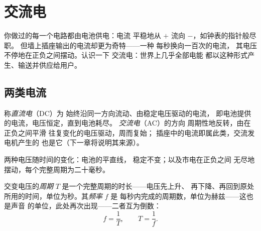 \chapter{交流电}\label{ch:g9:alternating-current}

你做过的每一个电路都由电池供电：电流
平稳地从 $+$ 流向 $-$，如钟表的指针般尽职。
但墙上插座输出的电流却更为奇特——一种
每秒换向一百次的电流，
其电压不停地在正负之间摆动。认识一下
交流电：世界上几乎全部电能
都以这种形式产生、输送并供应给用户。

\section{两类电流}

\begin{definition}[直流电与交流电]\label{def:g9:alternating-current:dcac}
称\emph{直流电}（DC）为
始终沿同一方向流动、由稳定电压驱动的电流，
即电池提供的电流，电压恒定，直到电池耗尽。
\emph{交流电}（AC）的方向
周期性地反转，由在正负之间平滑
往复变化的电压驱动，周而复始；
插座中的电流即属此类，交流发电机产生的
也是它（下一章将说明其来源）。
\end{definition}

\begin{omfigure}

{\small 两种电压随时间的变化：电池的平直线，
稳定不变；以及市电在正负之间
无尽地摆动，每个完整周期为二十毫秒。}
\end{omfigure}

\begin{definition}[周期与频率]\label{def:g9:alternating-current:period}
交变电压的\emph{周期} $T$
是一个完整周期的时长——电压先上升、
再下降、再回到原处所用的时间，单位为秒。其\emph{频率} $f$ 是
每秒内完成的周期数，单位为赫兹——这也是声音
的单位，此处再次出现——二者互为倒数：
\[
f = \frac{1}{T}, \qquad T = \frac{1}{f}.
\]
\end{definition}

